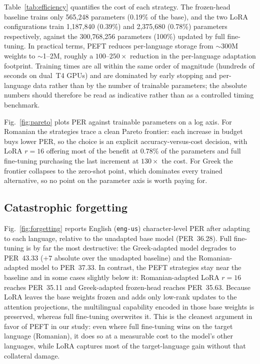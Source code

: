 \documentclass[conference]{IEEEtran}
\begin{document}
Table~\ref{tab:efficiency} quantifies the cost of each strategy. The frozen-head baseline trains only 565{,}248 parameters (0.19\% of the base), and the two LoRA configurations train 1{,}187{,}840 (0.39\%) and 2{,}375{,}680 (0.78\%) parameters respectively, against the 300{,}768{,}256 parameters (100\%) updated by full fine-tuning. In practical terms, PEFT reduces per-language storage from $\sim$300M weights to $\sim$1--2M, roughly a $100$--$250\times$ reduction in the per-language adaptation footprint. Training times are all within the same order of magnitude (hundreds of seconds on dual~T4 GPUs) and are dominated by early stopping and per-language data rather than by the number of trainable parameters; the absolute numbers should therefore be read as indicative rather than as a controlled timing benchmark.

Fig.~\ref{fig:pareto} plots PER against trainable parameters on a log axis. For Romanian the strategies trace a clean Pareto frontier: each increase in budget buys lower PER, so the choice is an explicit accuracy-versus-cost decision, with LoRA $r{=}16$ offering most of the benefit at $0.78\%$ of the parameters and full fine-tuning purchasing the last increment at $130\times$ the cost. For Greek the frontier collapses to the zero-shot point, which dominates every trained alternative, so no point on the parameter axis is worth paying for.

\subsection{Catastrophic forgetting}

Fig.~\ref{fig:forgetting} reports English (\texttt{eng-us}) character-level PER after adapting to each language, relative to the unadapted base model (PER~36.28). Full fine-tuning is by far the most destructive: the Greek-adapted model degrades to PER~43.33 ($+7$ absolute over the unadapted baseline) and the Romanian-adapted model to PER~37.33. In contrast, the PEFT strategies stay near the baseline and in some cases slightly below it: Romanian-adapted LoRA $r{=}16$ reaches PER~35.11 and Greek-adapted frozen-head reaches PER~35.63. Because LoRA leaves the base weights frozen and adds only low-rank updates to the attention projections, the multilingual capability encoded in those base weights is preserved, whereas full fine-tuning overwrites it. This is the cleanest argument in favor of PEFT in our study: even where full fine-tuning wins on the target language (Romanian), it does so at a measurable cost to the model's other languages, while LoRA captures most of the target-language gain without that collateral damage.
\end{document}

